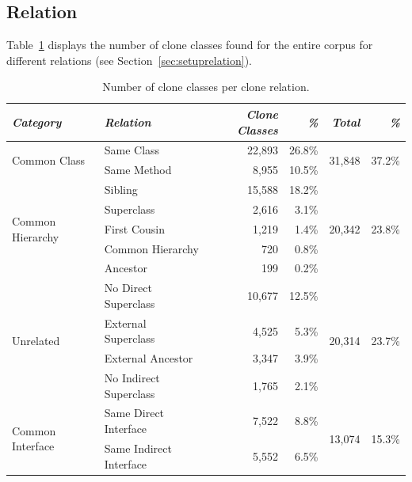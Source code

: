 \subsection{Relation} \label{sec:relationresults}
Table~\ref{tab:relation} displays the number of clone classes found for the entire corpus for different relations (see Section~\ref{sec:setuprelation}).

\begin{table}[H]
\centering
\begin{tabular}{@{}llrrrr@{}}
\toprule
\textit{\textbf{Category}} & \textit{\textbf{Relation}} & \textit{\textbf{Clone Classes}} & \textit{\textbf{\%}} & \textit{\textbf{Total}} & \textit{\textbf{\%}} \\ \midrule
\multirow{2}{*}{Common Class} & Same Class & 22,893 & 26.8\% & \multirow{2}{*}{31,848} & \multirow{2}{*}{37.2\%} \\ \cmidrule(lr){2-4}
 & Same Method & 8,955 & 10.5\% & & \\ \midrule
\multirow{5}{*}{Common Hierarchy} & Sibling & 15,588 & 18.2\% & \multirow{5}{*}{20,342}& \multirow{5}{*}{23.8\%} \\ \cmidrule(lr){2-4}
 & Superclass & 2,616 & 3.1\% & & \\ \cmidrule(lr){2-4}
 & First Cousin & 1,219 & 1.4\% & & \\ \cmidrule(lr){2-4}
 & Common Hierarchy & 720 & 0.8\% & & \\ \cmidrule(lr){2-4}
 & Ancestor & 199 & 0.2\% & & \\ \midrule
\multirow{4}{*}{Unrelated} & No Direct Superclass & 10,677 & 12.5\% & \multirow{4}{*}{20,314}& \multirow{4}{*}{23.7\%} \\ \cmidrule(lr){2-4}
 & External Superclass & 4,525 & 5.3\% & & \\ \cmidrule(lr){2-4}
 & External Ancestor & 3,347 & 3.9\% & & \\ \cmidrule(lr){2-4}
 & No Indirect Superclass & 1,765 & 2.1\% & & \\ \midrule
\multirow{2}{*}{Common Interface} & Same Direct Interface & 7,522 & 8.8\% & \multirow{2}{*}{13,074} & \multirow{2}{*}{15.3\%} \\ \cmidrule(lr){2-4}
 & Same Indirect Interface & 5,552 & 6.5\% & & \\ \bottomrule
\end{tabular}
\caption{Number of clone classes per clone relation.}
\label{tab:relation}
\end{table}


